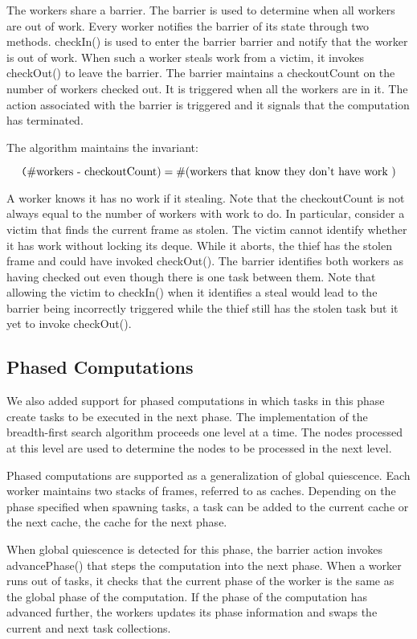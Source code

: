 The workers share a barrier. The barrier is used to determine when all
workers are out of work. Every worker notifies the barrier of its
state through two methods. {\java checkIn()} is used to enter the
barrier barrier and notify that the worker is out of work. When such a
worker steals work from a victim, it invokes {\java checkOut()} to
leave the barrier. The barrier maintains a {\java checkoutCount} on
the number of workers checked out. It is triggered when all the workers
are in it. The action associated with the barrier is triggered and it
signals that the computation has terminated.

The algorithm maintains the invariant:

\[
\mbox{{\texttt (\#workers - checkoutCount)}} = \mbox{\#(workers that know they don't
  have work )}
\]

A worker knows it has no work if it stealing. Note that the
checkoutCount is not always equal to the number of workers with work
to do. In particular, consider a victim that finds the current frame
as stolen. The victim cannot identify whether it has work without
locking its deque. While it aborts, the thief has the stolen
frame and could have invoked {\java checkOut()}. The barrier
identifies both workers as having checked out even though there is one
task between them. Note that allowing the victim to {\java
  checkIn()} when it identifies a steal would lead to the barrier
being incorrectly triggered while the thief still has the stolen task
but it yet to invoke {\java checkOut()}.


\subsection{Phased Computations}

We also added support for phased computations in which tasks in this
phase create tasks to be executed in the next phase. The
implementation of the breadth-first search algorithm proceeds one
level at a time. The nodes processed at this level are used to
determine the nodes to be processed in the next level.

Phased computations are supported as a generalization of global
quiescence. Each worker maintains two stacks of frames, referred to as
caches. Depending on the phase specified when spawning tasks, a task
can be added to the current cache or the next cache, the cache for the
next phase. 

When global quiescence is detected for this phase, the barrier action
invokes {\java advancePhase()} that steps the computation into the
next phase. When a worker runs out of tasks, it checks that the
current phase of the worker is the same as the global phase of the
computation. If the phase of the computation has advanced further, the
workers updates its phase information and swaps the current and next
task collections. 

